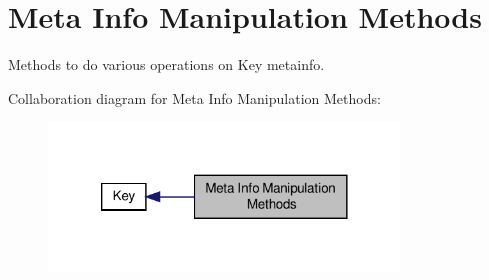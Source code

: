 \hypertarget{group__keymeta}{\section{Meta Info Manipulation Methods}
\label{group__keymeta}
}


Methods to do various operations on Key metainfo.  


Collaboration diagram for Meta Info Manipulation Methods\-:
\nopagebreak
\begin{figure}[H]
\begin{center}
\leavevmode
\includegraphics[width=264pt]{group__keymeta}
\end{center}
\end{figure}
